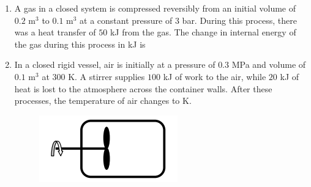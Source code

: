 \documentclass[a4paper,10pt]{article}
\begin{document}
\begin{enumerate}
    \item A gas in a closed system is compressed reversibly from an initial volume of $0.2$ m$^3$ to $0.1$ m$^3$ at a constant pressure of $3$ bar. During this process, there was a heat transfer of $50$ kJ from the gas. The change in internal energy of the gas during this process in kJ is
    
    \hfill{}
    \begin{enumerate}
    \end{enumerate}

    \item In a closed rigid vessel, air is initially at a pressure of $0.3$ MPa and volume of $0.1$ m$^3$ at $300$ K. A stirrer supplies $100$ kJ of work to the air, while $20$ kJ of heat is lost to the atmosphere across the container walls. After these processes, the temperature of air changes to \underline{\hspace{2cm}} K.
    \begin{figure}[H] \centering \includegraphics[width=0.4\columnwidth]{q11_thermo.png} \caption*{} \label{fig:q11_thermo} \end{figure}
    
    \hfill{}
    \begin{enumerate}
    \end{enumerate}


\end{enumerate}
\end{document}
